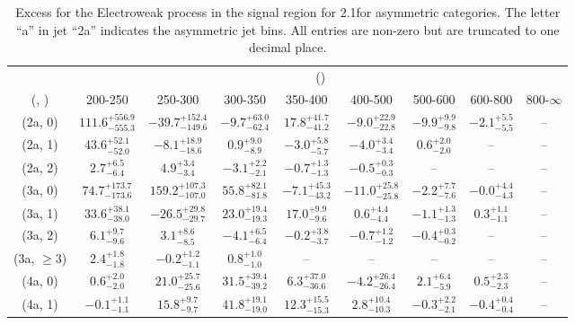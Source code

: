 \begin{table}[h!]
\tiny
\centering
\caption{Excess for the Electroweak process in the signal region for 2.1\ifb for asymmetric categories. The letter ``a'' in jet \eg ``2a''  indicates the asymmetric jet bins. All entries are non-zero but are truncated to one decimal place.\label{tab:excesssepnaive_sig_ewk_asym}}
\begin{tabular}
{ccccccccc}
	\hline\hline
	& \multicolumn{8}{c}{\scalht (\gev)} \\ 
	 (\njet,  \nb) & 200-250 & 250-300 & 300-350 & 350-400 & 400-500 & 500-600 & 600-800 & 800-$\infty$ \\ [0.8ex] 
\hline
	(2a, 0) & $111.6^{+ 556.9 }_{- 555.3 }$ & $-39.7^{+ 152.4 }_{- 149.6 }$ & $-9.7^{+ 63.0 }_{- 62.4 }$ & $17.8^{+ 41.7 }_{- 41.2 }$ & $-9.0^{+ 22.9 }_{- 22.8 }$ & $-9.9^{+ 9.9 }_{- 9.8 }$ & $-2.1^{+ 5.5 }_{- 5.5 }$ & -- \\[0.5ex] 
	(2a, 1) & $43.6^{+ 52.1 }_{- 52.0 }$ & $-8.1^{+ 18.9 }_{- 18.6 }$ & $0.9^{+ 9.0 }_{- 8.9 }$ & $-3.0^{+ 5.8 }_{- 5.7 }$ & $-4.0^{+ 3.4 }_{- 3.4 }$ & $0.6^{+ 2.0 }_{- 2.0 }$ & -- & -- \\[0.5ex] 
	(2a, 2) & $2.7^{+ 6.5 }_{- 6.4 }$ & $4.9^{+ 3.4 }_{- 3.4 }$ & $-3.1^{+ 2.2 }_{- 2.1 }$ & $-0.7^{+ 1.3 }_{- 1.3 }$ & $-0.5^{+ 0.3 }_{- 0.3 }$ & -- & -- & -- \\[0.5ex] 
	(3a, 0) & $74.7^{+ 173.7 }_{- 173.6 }$ & $159.2^{+ 107.3 }_{- 107.0 }$ & $55.8^{+ 82.1 }_{- 81.8 }$ & $-7.1^{+ 45.3 }_{- 43.2 }$ & $-11.0^{+ 25.8 }_{- 25.8 }$ & $-2.2^{+ 7.7 }_{- 7.6 }$ & $-0.0^{+ 4.4 }_{- 4.3 }$ & -- \\[0.5ex] 
	(3a, 1) & $33.6^{+ 38.1 }_{- 38.0 }$ & $-26.5^{+ 29.8 }_{- 29.7 }$ & $23.0^{+ 19.4 }_{- 19.3 }$ & $17.0^{+ 9.9 }_{- 9.6 }$ & $0.6^{+ 4.4 }_{- 4.4 }$ & $-1.1^{+ 1.3 }_{- 1.3 }$ & $0.3^{+ 1.1 }_{- 1.1 }$ & -- \\[0.5ex] 
	(3a, 2) & $6.1^{+ 9.7 }_{- 9.6 }$ & $3.1^{+ 8.6 }_{- 8.5 }$ & $-4.1^{+ 6.5 }_{- 6.4 }$ & $-0.2^{+ 3.8 }_{- 3.7 }$ & $-0.7^{+ 1.2 }_{- 1.2 }$ & $-0.4^{+ 0.3 }_{- 0.2 }$ & -- & -- \\[0.5ex] 
	(3a, $\ge3$) & $2.4^{+ 1.8 }_{- 1.8 }$ & $-0.2^{+ 1.2 }_{- 1.1 }$ & $0.8^{+ 1.0 }_{- 1.0 }$ & -- & -- & -- & -- & -- \\[0.5ex] 
	(4a, 0) & $0.6^{+ 2.0 }_{- 2.0 }$ & $21.0^{+ 25.7 }_{- 25.6 }$ & $31.5^{+ 39.4 }_{- 39.2 }$ & $6.3^{+ 37.0 }_{- 36.6 }$ & $-4.2^{+ 26.4 }_{- 26.4 }$ & $2.1^{+ 6.4 }_{- 5.9 }$ & $0.5^{+ 2.3 }_{- 2.3 }$ & -- \\[0.5ex] 
	(4a, 1) & $-0.1^{+ 1.1 }_{- 1.1 }$ & $15.8^{+ 9.7 }_{- 9.7 }$ & $41.8^{+ 19.1 }_{- 19.0 }$ & $12.3^{+ 15.5 }_{- 15.3 }$ & $2.8^{+ 10.4 }_{- 10.3 }$ & $-0.3^{+ 2.2 }_{- 2.1 }$ & $-0.4^{+ 0.4 }_{- 0.4 }$ & -- \\[0.5ex] 

\end{tabular}
\end{table}
